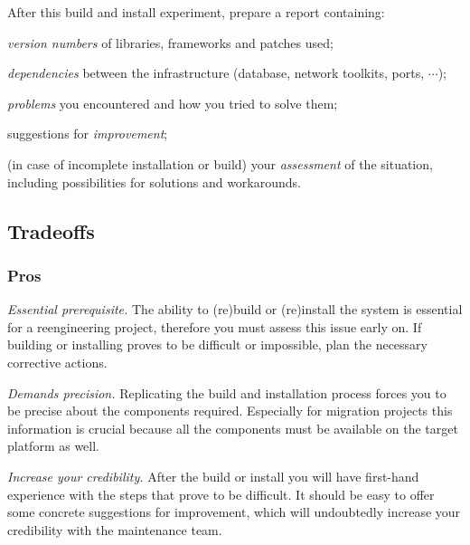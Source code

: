 \documentclass[a4paper,10pt,twoside]{book}
\begin{document}
After this build and install experiment, prepare a report containing:

\begin{bulletlist}
  \item \emph{version numbers} of libraries, frameworks and patches used;

  \item \emph{dependencies} between the infrastructure (database, network toolkits, ports, $\cdots$);

  \item \emph{problems} you encountered and how you tried to solve them;

  \item suggestions for \emph{improvement};

  \item (in case of incomplete installation or build) your \emph{assessment} of the situation, including possibilities for solutions and workarounds.
\end{bulletlist}

\subsection*{Tradeoffs}

\subsubsection*{Pros}

\begin{bulletlist}
  \item \emph{Essential prerequisite.}
The ability to (re)build or (re)install the system is essential for a reengineering project, therefore you must assess this issue early on. If building or installing proves to be difficult or impossible, plan the necessary corrective actions.

  \item \emph{Demands precision.}
Replicating the build and installation process forces you to be precise about the components required. Especially for migration projects this information is crucial because all the components must be available on the target platform as well.

  \item \emph{Increase your credibility.}
After the build or install you will have first-hand experience with the steps that prove to be difficult. It should be easy to offer some concrete suggestions for improvement, which will undoubtedly increase your credibility with the maintenance team.
\end{bulletlist}
\end{document}

